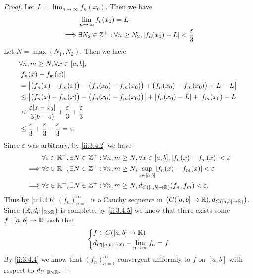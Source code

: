 \begin{proof}
  Let \(L = \lim_{n \to \infty} f_n(x_0)\).
  Then we have
  \begin{align*}
             & \lim_{n \to \infty} f_n(x_0) = L                                                       \\
    \implies & \exists N_2 \in \mathbb{Z}^+ : \forall n \geq N_2, \left\lvert f_n(x_0) - L\right\rvert < \dfrac{\varepsilon}{3}
  \end{align*}
  Let \(N = \max(N_1, N_2)\).
  Then we have
  \begin{align*}
     & \forall n, m \geq N, \forall x \in [a, b],                                                                     \\
     & \abs{f_n(x) - f_m(x)}                                                                                          \\
     & = \abs{\big(f_n(x) - f_m(x)\big) - \big(f_n(x_0) - f_m(x_0)\big) + \big(f_n(x_0) - f_m(x_0)\big) + L - L}      \\
     & \leq \abs{\big(f_n(x) - f_m(x)\big) - \big(f_n(x_0) - f_m(x_0)\big)} + \abs{f_n(x_0) - L} + \abs{f_m(x_0) - L} \\
     & < \dfrac{\varepsilon \abs{x - x_0}}{3(b - a)} + \dfrac{\varepsilon}{3} + \dfrac{\varepsilon}{3}                \\
     & \leq \dfrac{\varepsilon}{3} + \dfrac{\varepsilon}{3} + \dfrac{\varepsilon}{3} = \varepsilon.
  \end{align*}
  Since \(\varepsilon\) was arbitrary, by \cref{ii:3.4.2} we have
  \begin{align*}
             & \forall \varepsilon \in \R^+, \exists N \in \Z^+ : \forall n, m \geq N, \forall x \in [a, b], \abs{f_n(x) - f_m(x)} < \varepsilon \\
    \implies & \forall \varepsilon \in \R^+, \exists N \in \Z^+ : \forall n, m \geq N, \sup_{x \in [a, b]}\abs{f_n(x) - f_m(x)} < \varepsilon    \\
    \implies & \forall \varepsilon \in \R^+, \exists N \in \Z^+ : \forall n, m \geq N, d_{C([a, b] \to \R)}(f_n, f_m) < \varepsilon.
  \end{align*}
  Thus by \cref{ii:1.4.6} \((f_n)_{n = 1}^\infty\) is a Cauchy sequence in \(\big(C([a, b] \to \mathbb{R}), d_{C([a, b] \to \mathbb{R})}\big)\).
  Since \((\mathbb{R}, d_{l^1}|_{\mathbb{R} \times \mathbb{R}})\) is complete, by \cref{ii:3.4.5} we know that there exists some \(f : [a, b] \to \mathbb{R}\) such that
  \[
    \begin{dcases}
      f \in C([a, b] \to \mathbb{R}) \\
      d_{C([a, b] \to \mathbb{R})} - \lim_{n \to \infty} f_n = f
    \end{dcases}
  \]
  By \cref{ii:3.4.4} we know that \((f_n)_{n = 1}^\infty\) convergent uniformly to \(f\) on \([a, b]\) with respect to \(d_{l^1}|_{\mathbb{R} \times \mathbb{R}}\).


\end{proof}
